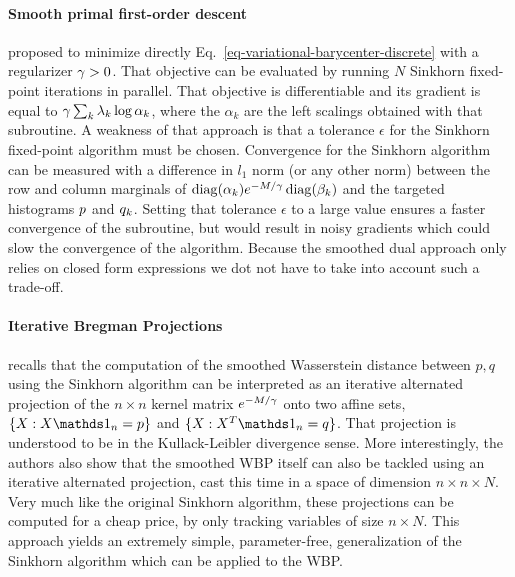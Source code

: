 
\paragraph{Smooth primal first-order descent} \cite[\S5]{cuturi2014fast} proposed to minimize directly Eq.~\eqref{eq-variational-barycenter-discrete} with a regularizer $\gamma>0$. That objective can be evaluated by running $N$ Sinkhorn fixed-point iterations in parallel. That objective is differentiable and its gradient is equal to $\gamma\sum_k \lambda_k \log \alpha_k$, where the $\alpha_k$ are the left scalings obtained with that subroutine. A weakness of that approach is that a tolerance $\epsilon$ for the Sinkhorn fixed-point algorithm must be chosen. Convergence for the Sinkhorn algorithm can be measured with a difference in $l_1$ norm (or any other norm) between the row and column marginals of $\diag(\alpha_k)e^{-M/\ga}\diag(\beta_k)$ and the targeted histograms $p$ and $q_k$. Setting that tolerance $\epsilon$ to a large value ensures a faster convergence of the subroutine, but would result in noisy gradients which could slow the convergence of the algorithm. Because the smoothed dual approach only relies on closed form expressions we dot not have to take into account such a trade-off.

\paragraph{Iterative Bregman Projections} \cite[Prop. 1]{DBLP:journals/siamsc/BenamouCCNP15} recalls that the computation of the smoothed Wasserstein distance between $p,q$ using the Sinkhorn algorithm can be interpreted as an iterative alternated projection of the $n\times n$ kernel matrix $e^{-M/\gamma}$ onto two affine sets, $\{X:X\ones_n=p\}$ and $\{X:X^T\ones_n=q\}$. That projection is understood to be in the Kullack-Leibler divergence sense. More interestingly, the authors also show that the smoothed WBP itself can also be tackled using an iterative alternated projection, cast this time in a space of dimension $ n\times n \times N$. Very much like the original Sinkhorn algorithm, these projections can be computed for a cheap price, by only tracking variables of size $n\times N$. This approach yields an extremely simple, parameter-free, generalization of the Sinkhorn algorithm which can be applied to the WBP.

